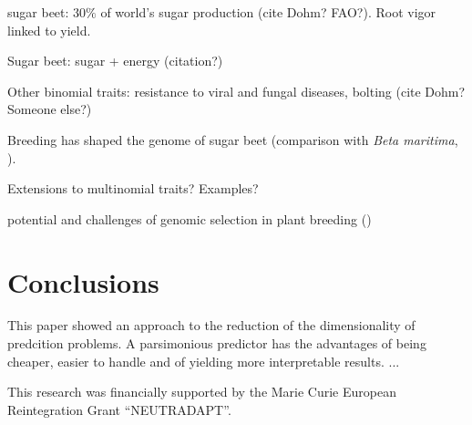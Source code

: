 sugar beet: $30\%$ of world's sugar production (cite Dohm? FAO?). Root
vigor linked to yield.

Sugar beet: sugar + energy (citation?)

Other binomial traits: resistance to viral and fungal diseases, bolting
(cite Dohm? Someone else?)

Breeding has shaped the genome of sugar beet (comparison with \emph{Beta
  maritima}, \cite{dohm2013genome}).

Extensions to multinomial traits? Examples?

potential and challenges of genomic selection in plant breeding (\cite{jonas2013does})

%

\section{Conclusions}
\label{sec:conclusions}
This paper showed an approach to the reduction of the dimensionality of
predcition problems. A parsimonious predictor has the advantages of
being cheaper, easier to handle and of yielding more interpretable
results. ...


\begin{acknowledgements}
This research was financially supported by the Marie Curie European
Reintegration Grant ``NEUTRADAPT''.
\end{acknowledgements}


